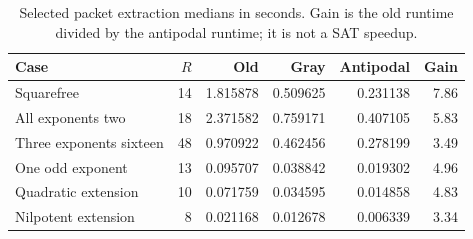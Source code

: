 \begin{table}[htbp]
\centering\small
\begin{tabular}{@{}lrrrrr@{}}
\toprule
Case & $R$ & Old & Gray & Antipodal & Gain\\\midrule
Squarefree & 14 & 1.815878 & 0.509625 & 0.231138 & 7.86\\
All exponents two & 18 & 2.371582 & 0.759171 & 0.407105 & 5.83\\
Three exponents sixteen & 48 & 0.970922 & 0.462456 & 0.278199 & 3.49\\
One odd exponent & 13 & 0.095707 & 0.038842 & 0.019302 & 4.96\\
Quadratic extension & 10 & 0.071759 & 0.034595 & 0.014858 & 4.83\\
Nilpotent extension & 8 & 0.021168 & 0.012678 & 0.006339 & 3.34\\
\bottomrule
\end{tabular}
\caption{Selected packet extraction medians in seconds. Gain is the old runtime divided by the antipodal runtime; it is not a SAT speedup.}
\end{table}
